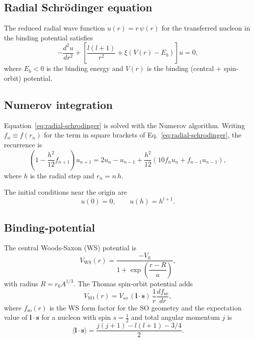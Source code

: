 \documentclass[12pt,a4paper]{article}
\begin{document}
\subsection{Radial Schrödinger equation}

The reduced radial wave function $u(r) = r\,\psi(r)$ for the
transferred nucleon in the binding potential satisfies
\begin{equation}
  -\frac{d^2 u}{dr^2} + \left[\frac{l(l+1)}{r^2}
  + \xi\left(V(r) - E_b\right)\right]u = 0,
  \label{eq:radial-schrodinger}
\end{equation}
where $E_b < 0$ is the binding energy and $V(r)$ is the binding
(central + spin-orbit) potential.

\subsection{Numerov integration}

Equation~\eqref{eq:radial-schrodinger} is solved with the Numerov
algorithm.  Writing $f_n \equiv f(r_n)$ for the term in square
brackets of Eq.~\eqref{eq:radial-schrodinger}, the recurrence is
\begin{equation}
  \left(1 - \frac{h^2}{12}f_{n+1}\right)u_{n+1}
  = 2u_n - u_{n-1}
  + \frac{h^2}{12}\left(10 f_n u_n + f_{n-1} u_{n-1}\right),
  \label{eq:numerov}
\end{equation}
where $h$ is the radial step and $r_n = n\,h$.

The initial conditions near the origin are
\begin{equation}
  u(0) = 0, \qquad
  u(h) = h^{l+1}.
  \label{eq:bound-start}
\end{equation}

\subsection{Binding-potential}

The central Woods-Saxon (WS) potential is
\begin{equation}
  V_\mathrm{WS}(r) = \frac{-V_0}{1 + \exp\!\left(\dfrac{r-R}{a}\right)},
  \label{eq:ws}
\end{equation}
with radius $R = r_0 A^{1/3}$.  The Thomas spin-orbit potential adds
\begin{equation}
  V_\mathrm{SO}(r) = V_{so}\,(\bm{l}\cdot\bm{s})\,
  \frac{1}{r}\frac{df_\mathrm{so}}{dr},
  \label{eq:spin-orbit}
\end{equation}
where $f_\mathrm{so}(r)$ is the WS form factor for the SO geometry
and the expectation value of $\bm{l}\cdot\bm{s}$ for a nucleon with
spin $s=\tfrac{1}{2}$ and total angular momentum $j$ is
\begin{equation}
  \langle\bm{l}\cdot\bm{s}\rangle = \frac{j(j+1)-l(l+1)-3/4}{2}.
\end{equation}
\end{document}
